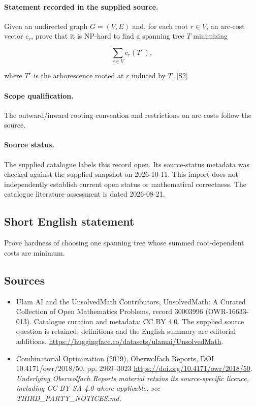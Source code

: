 \documentclass[11pt]{article}
\begin{document}
\paragraph{Statement recorded in the supplied source.}
Given an undirected graph $G=(V,E)$ and, for each root $r\in V$, an arc-cost vector $c_r$, prove that it is NP-hard to find a spanning tree $T$ minimizing

$$\sum_{r\in V}c_r(T^r),$$

where $T^r$ is the arborescence rooted at $r$ induced by $T$. \href{https://doi.org/10.4171/owr/2018/50}{[S2]}
\paragraph{Scope qualification.}
The outward/inward rooting convention and restrictions on arc costs follow the source.
\paragraph{Source status.}
The supplied catalogue labels this record open. Its source-status metadata was checked against the supplied snapshot on 2026-10-11. This import does not independently establish current open status or mathematical correctness. The catalogue literature assessment is dated 2026-08-21.
\subsection{Short English statement}
Prove hardness of choosing one spanning tree whose summed root-dependent costs are minimum.
\subsection{Sources}
\begin{itemize}
\item[S1] Ulam AI and the UnsolvedMath Contributors, UnsolvedMath: A Curated Collection of Open Mathematics Problems, record 30003996 (OWR-16633-013). Catalogue curation and metadata: CC BY 4.0. The supplied source question is retained; definitions and the English summary are editorial additions.
\url{https://huggingface.co/datasets/ulamai/UnsolvedMath}.
\item[S2] Combinatorial Optimization (2019), Oberwolfach Reports, DOI 10.4171/owr/2018/50, pp. 2969--3023
\url{https://doi.org/10.4171/owr/2018/50}.
\textit{Underlying Oberwolfach Reports material retains its source-specific licence, including CC BY-SA 4.0 where applicable; see THIRD\_PARTY\_NOTICES.md.}
\end{itemize}
\end{document}
